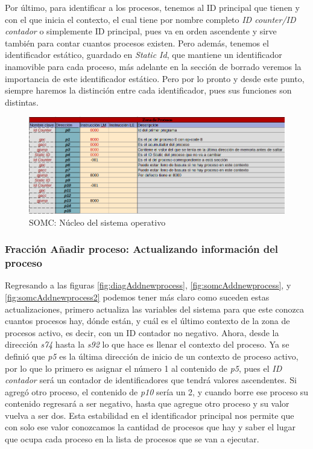 \documentclass[letterpaper,12pt,oneside]{book}
\begin{document}
            Por último, para identificar a los procesos, tenemos al ID principal que tienen y con el que
			inicia el contexto, el cual tiene
			por nombre completo  \textit{ID counter/ID contador} o simplemente ID principal, pues va en orden ascendente y sirve también para contar cuantos procesos existen. Pero además, tenemos el identificador
			estático, guardado en \textit{Static Id}, que mantiene un identificador inamovible para cada proceso,
   más adelante en la sección de borrado veremos la importancia de este identificador
			estático. Pero por lo pronto y desde este punto, siempre haremos la distinción entre cada identificador, pues sus funciones son distintas.		
			

			
		\begin{figure}[h]		
			\centering
			\includegraphics[scale=0.55]{media/CARDIACC/Zona_De_Procesos.png}
			\caption{SOMC: Núcleo del sistema operativo}
			\label{fig:somcZonaDeProcesos}
		\end{figure}

            \subsubsection{Fracción Añadir proceso: Actualizando información del proceso}
            
			Regresando a las figuras  \ref{fig:diagAddnewprocess}, \ref{fig:somcAddnewprocess}, y \ref{fig:somcAddnewprocess2} podemos tener más claro
			como suceden estas actualizaciones, primero actualiza las variables del sistema para que este conozca cuantos procesos hay, dónde están, y cuál es el último
			contexto de la zona de procesos activo, es decir, con un ID contador no negativo. Ahora, desde la dirección \textit{s74} hasta
			la \textit{s92} lo que hace es llenar el contexto del proceso. Ya se definió que \textit{p5} es la última dirección de inicio de un contexto
			de proceso activo, por lo que lo primero es asignar el número 1 al contenido de \textit{p5}, pues el \textit{ID contador} será un contador de identificadores
			que tendrá valores ascendentes. Si agregó otro proceso, el contenido de \textit{p10} sería un 2, y cuando borre ese proceso
			su contenido regresará a ser negativo, hasta que agregue otro proceso y su valor vuelva a ser dos. Esta estabilidad en el identificador principal
			nos permite que con solo ese valor conozcamos la cantidad de procesos que hay  y saber el lugar que ocupa cada proceso en la lista
			de procesos que se van a ejecutar.
			
\end{document}
